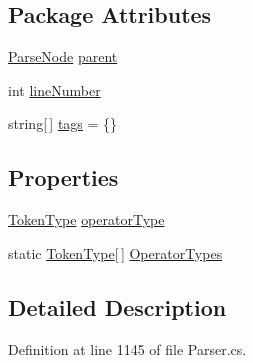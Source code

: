 \subsection*{Package Attributes}
\begin{DoxyCompactItemize}
\item 
\hyperlink{a00150}{Parse\-Node} \hyperlink{a00150_af313a82103fcc2ff5a177dbb06b92f7b}{parent}
\item 
int \hyperlink{a00150_a18b493382de0fde5b4299c1bd2250075}{line\-Number}
\item 
string\mbox{[}$\,$\mbox{]} \hyperlink{a00150_a58b3a15788fd2d4127d73619dc6d04ae}{tags} = \{\}
\end{DoxyCompactItemize}
\subsection*{Properties}
\begin{DoxyCompactItemize}
\item 
\hyperlink{a00053_a301aa7c866593a5b625a8fc158bbeace}{Token\-Type} \hyperlink{a00145_ac2de2f59be0e69b316627a4de16fadd3}{operator\-Type}
\item 
static \hyperlink{a00053_a301aa7c866593a5b625a8fc158bbeace}{Token\-Type}\mbox{[}$\,$\mbox{]} \hyperlink{a00145_ad8a4bb1b46dbc3d1b7708e78a2d97e1c}{Operator\-Types}
\end{DoxyCompactItemize}


\subsection{Detailed Description}


Definition at line 1145 of file Parser.\-cs.



